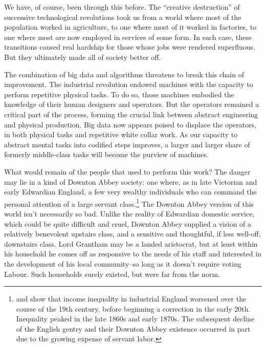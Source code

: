 \documentclass[12pt]{article}
\begin{document}
We have, of course, been through this before. The ``creative
destruction'' of successive technological revolutions took us from a
world where most of the population worked in agriculture, to one where
most of it worked in factories, to one where most are now employed in
services of some form. In each case, these transitions caused real
hardship for those whose jobs were rendered superfluous. But they
ultimately made all of society better off. 

The combination of big data and algorithms threatens to break this
chain of improvement. The industrial revolution endowed machines with
the capacity to perform repetitive physical tasks. To do so, those
machines embodied the knowledge of their human designers and
operators. But the operators remained a critical part of the process,
forming the crucial link between abstract engineering and physical
production. Big data now appears poised to displace the operators, in
both physical tasks and repetitive white collar work. As our capacity
to abstract mental tasks into codified steps improves, a larger and
larger share of formerly middle-class tasks will become the purview of
machines. 

What would remain of the people that used to perform this work? The
danger may lie in a kind of Downton Abbey society: one where, as in
late Victorian and early Edwardian England, a few very
wealthy individuals who can command the personal attention of a large
servant class.\footnote{\cite{lindert1983reinterpreting} and \cite{lindert2000three} show that
  income inequality in industrial England worsened over the course of
  the 19th century, before beginning a correction in the early
  20th. Inequality peaked in the late 1860s and early 1870s. The
  subsequent decline of the English gentry and their Downton Abbey
  existence occurred in part due to the growing expense of servant
  labor.} The Downton Abbey version of this world isn't
necessarily so bad. Unlike the reality of Edwardian domestic service,
which could be quite difficult and cruel, Downton Abbey supplied a
vision of a relatively benevolent upstairs class, and a sensitive and
thoughtful, if less well-off, downstairs class. Lord Grantham may be
a landed aristocrat, but at least within his household he comes off as
responsive to the needs of his staff and interested in the development
of his local community--so long as it doesn't require voting
Labour. Such households surely existed, but were far from the
norm. 
\end{document}

